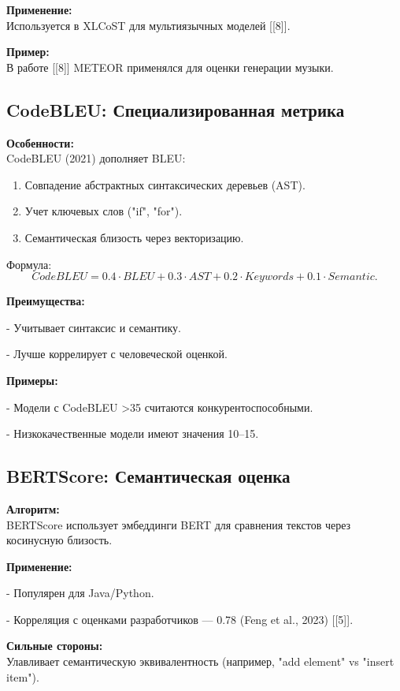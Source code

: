 \documentclass[14pt]{article}
\theoremstyle{definition}
\begin{document}
\textbf{Применение:} \\
Используется в XLCoST для мультиязычных моделей [[8]].

\textbf{Пример:} \\
В работе [[8]] METEOR применялся для оценки генерации музыки.

\subsection{CodeBLEU: Специализированная метрика}

\textbf{Особенности:} \\
CodeBLEU (2021) дополняет BLEU:
\begin{enumerate}
    \item Совпадение абстрактных синтаксических деревьев (AST).
    \item Учет ключевых слов ("if", "for").
    \item Семантическая близость через векторизацию.
\end{enumerate}

Формула:
\[
CodeBLEU = 0.4 \cdot BLEU + 0.3 \cdot AST + 0.2 \cdot Keywords + 0.1 \cdot Semantic.
\]

\textbf{Преимущества:}

    
- Учитывает синтаксис и семантику.
    
- Лучше коррелирует с человеческой оценкой.


\textbf{Примеры:}

    
- Модели с CodeBLEU >35 считаются конкурентоспособными.
    
- Низкокачественные модели имеют значения 10–15.


\subsection{BERTScore: Семантическая оценка}

\textbf{Алгоритм:} \\
BERTScore использует эмбеддинги BERT для сравнения текстов через косинусную близость.

\textbf{Применение:}

    
- Популярен для Java/Python.
    
- Корреляция с оценками разработчиков — 0.78 (Feng et al., 2023) [[5]].


\textbf{Сильные стороны:} \\
Улавливает семантическую эквивалентность (например, "add element" vs "insert item").
\end{document}
